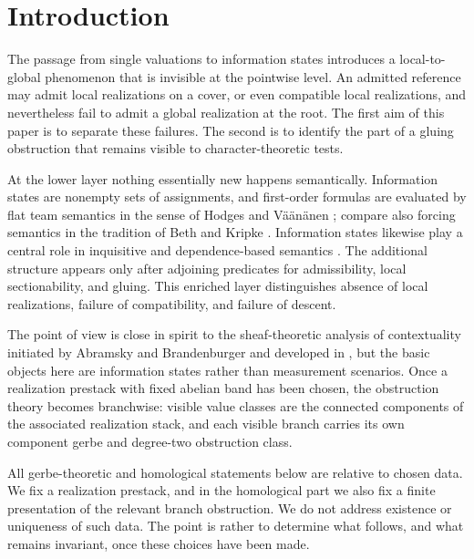 \section{Introduction}\label{sec:introduction}

The passage from single valuations to information states introduces a local-to-global phenomenon that is invisible at the pointwise level. An admitted reference may admit local realizations on a cover, or even compatible local realizations, and nevertheless fail to admit a global realization at the root. The first aim of this paper is to separate these failures. The second is to identify the part of a gluing obstruction that remains visible to character-theoretic tests.

At the lower layer nothing essentially new happens semantically. Information states are nonempty sets of assignments, and first-order formulas are evaluated by flat team semantics in the sense of Hodges and V\"a\"an\"anen \cite{Hodges1997,Vaananen2007}; compare also forcing semantics in the tradition of Beth and Kripke \cite{Beth1956,Kripke1965,TroelstraVanDalen1988}. Information states likewise play a central role in inquisitive and dependence-based semantics \cite{CiardelliGroenendijsenRoelofsen2019,CiardelliGrilletti2022,AlbertGradel2022}. The additional structure appears only after adjoining predicates for admissibility, local sectionability, and gluing. This enriched layer distinguishes absence of local realizations, failure of compatibility, and failure of descent.

The point of view is close in spirit to the sheaf-theoretic analysis of contextuality initiated by Abramsky and Brandenburger and developed in \cite{AbramskyMansfield2012,AbramskyEtAl2015,MansfieldBarbosa2013,BeerOsborne2018,BudroniCabelloGuhneKleinmannLarsson2022}, but the basic objects here are information states rather than measurement scenarios. Once a realization prestack with fixed abelian band has been chosen, the obstruction theory becomes branchwise: visible value classes are the connected components of the associated realization stack, and each visible branch carries its own component gerbe and degree-two obstruction class.

All gerbe-theoretic and homological statements below are relative to chosen data. We fix a realization prestack, and in the homological part we also fix a finite presentation of the relevant branch obstruction. We do not address existence or uniqueness of such data. The point is rather to determine what follows, and what remains invariant, once these choices have been made.


